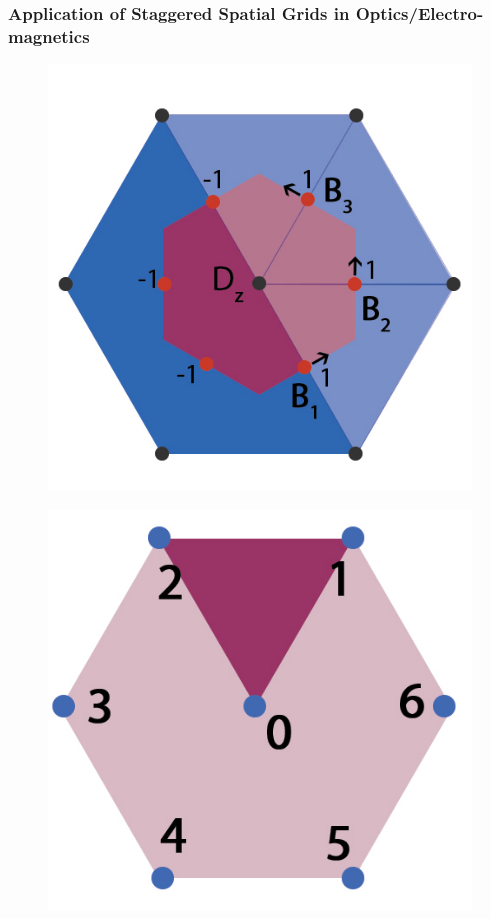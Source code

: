 \documentclass{beamer}
\begin{document}
\begin{frame}
\frametitle{Application of Staggered Spatial Grids in Optics/Electro-magnetics}
\tiny
\begin{figure}
\centering
\begin{minipage}{.5\textwidth}
  \centering
\includegraphics[scale=0.2]{./images/jpgStaggeredUncolocated.jpg}
\label{fig:StaggeredColocated}
\end{minipage}%
\begin{minipage}{.5\textwidth}
  \centering
\includegraphics[scale=0.2]{./images/jpgHexGridStruc.jpg}
\end{minipage}
\end{figure}


\end{frame}
\end{document}
